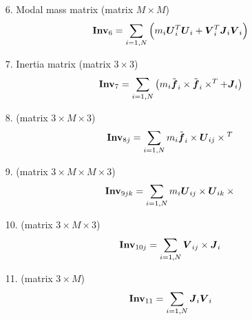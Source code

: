 \begin{enumerate}
\item[6.] Modal mass matrix
(matrix $M\times{M}$)
\begin{equation}
	\boldsymbol{\mathrm{Inv}}_6 = \sum_{i=1,N} \left( 
		m_i \boldsymbol{U}_i^T \boldsymbol{U}_i
		+ \boldsymbol{V}_i^T \boldsymbol{J}_i \boldsymbol{V}_i
	 \right)
\end{equation}

\item[7.] Inertia matrix
(matrix $3\times{3}$)
\begin{equation}
	\boldsymbol{\mathrm{Inv}}_7 = \sum_{i=1,N} \left( 
		m_i \tilde{\boldsymbol{f}}_i \times \tilde{\boldsymbol{f}}_i \times^T + \boldsymbol{J}_i
	 \right)
\end{equation}

\item[8.]
(matrix $3\times{M}\times{3}$)
\begin{equation}
	\boldsymbol{\mathrm{Inv}}_{8j} =
		\sum_{i=1,N} m_i \tilde{\boldsymbol{f}}_{i} \times \boldsymbol{U}_{ij} \times{}^T
\end{equation}

\item[9.]
(matrix $3\times{M}\times{M}\times{3}$)
\begin{equation}
	\boldsymbol{\mathrm{Inv}}_{9jk} = \sum_{i=1,N} m_i \boldsymbol{U}_{ij} \times \boldsymbol{U}_{ik} \times{}
\end{equation}

\item[10.]
(matrix $3\times{M}\times{3}$)
\begin{equation}
	\boldsymbol{\mathrm{Inv}}_{10j} = \sum_{i=1,N} \boldsymbol{V}_{ij}\times \boldsymbol{J}_i
\end{equation}

\item[11.]
(matrix $3\times{M}$)
\begin{equation}
	\boldsymbol{\mathrm{Inv}}_{11} = \sum_{i=1,N} \boldsymbol{J}_i \boldsymbol{V}_i
\end{equation}

\end{enumerate}

